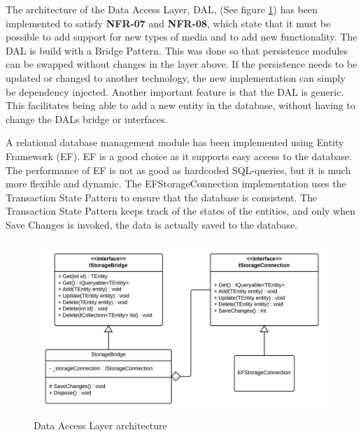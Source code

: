 \documentclass[../report.tex]{subfiles}
\begin{document}
\graphicspath{{img/}{../img/}}

The architecture of the Data Access Layer, DAL, (See figure \ref{fig:DALclassdiagram}) has been implemented to satisfy \textbf{NFR-07} and \textbf{NFR-08}, which state that it must be possible to add support for new types of media and to add new functionality. The DAL is build with a Bridge Pattern. This was done so that persistence modules can be swapped without changes in the layer above. If the persistence needs to be updated or changed to another technology, the new implementation can simply be dependency injected. Another important feature is that the DAL is generic. This facilitates being able to add a new entity in the database, without having to change the DALs bridge or interfaces.

A relational database management module has been implemented using Entity Framework (EF). EF is a good choice as it supports easy access to the database. The performance of EF is not as good as hardcoded SQL-queries, but it is much more flexible and dynamic. The EFStorageConnection implementation uses the Transaction State Pattern to ensure that the database is consistent. The Transaction State Pattern keeps track of the states of the entities, and only when Save Changes is invoked, the data is actually saved to the database.

\begin{figure}[H]
\centering
\includegraphics[width=\linewidth]{DALclassdiagram.png}
\caption{Data Access Layer architecture}
\label{fig:DALclassdiagram}
\end{figure} 
\end{document}
